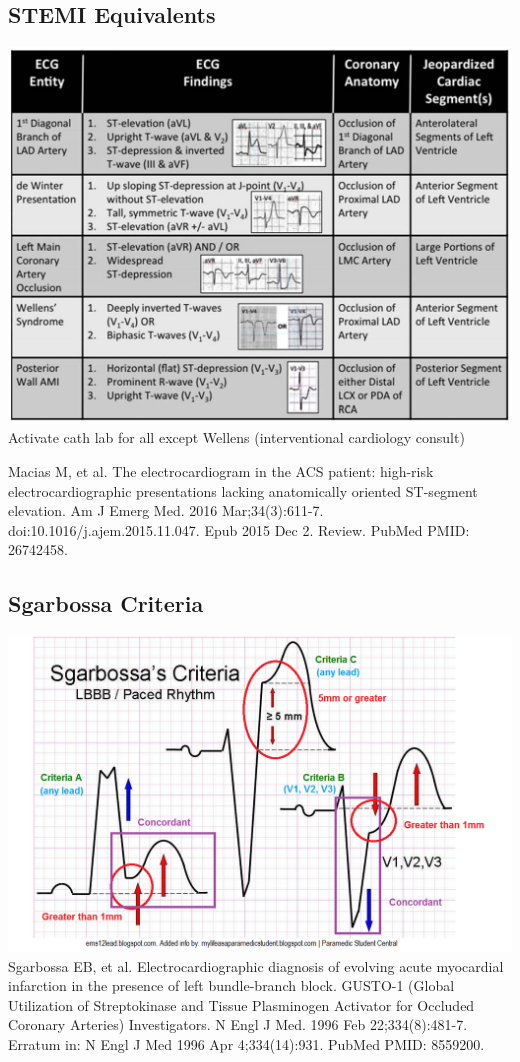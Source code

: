 \documentclass[8pt]{extarticle}
\begin{document}
\subsection{STEMI Equivalents}
\includegraphics[height=\textwidth, angle=90]{5_ecgs.png}
Activate cath lab for all except Wellens (interventional cardiology consult)\break

\tiny{Macias M, et al. The electrocardiogram in the ACS
patient: high-risk electrocardiographic presentations lacking anatomically oriented ST-segment elevation. Am J Emerg Med. 2016 Mar;34(3):611-7. doi:10.1016/j.ajem.2015.11.047. Epub 2015 Dec 2. Review. PubMed PMID: 26742458.}

\subsection{Sgarbossa Criteria}
\includegraphics[width=\textwidth]{sgarbossa.png}
\tiny{Sgarbossa EB, et al. Electrocardiographic diagnosis of evolving acute myocardial
infarction in the presence of left bundle-branch block. GUSTO-1 (Global
Utilization of Streptokinase and Tissue Plasminogen Activator for Occluded
Coronary Arteries) Investigators. N Engl J Med. 1996 Feb 22;334(8):481-7. Erratum
in: N Engl J Med 1996 Apr 4;334(14):931. PubMed PMID: 8559200.}
\end{document}
